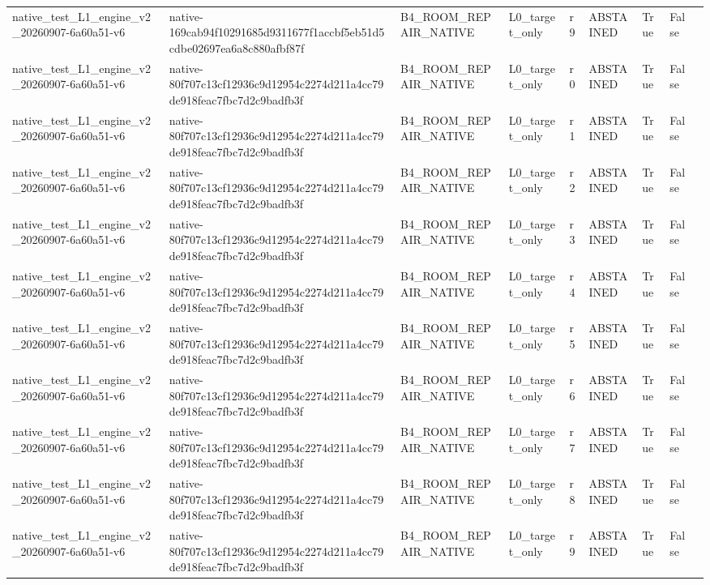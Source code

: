 \begin{tabular}{lllllllll}
native\_test\_L1\_engine\_v2\_20260907-6a60a51-v6 & native-169cab94f10291685d9311677f1accbf5eb51d5cdbe02697ea6a8c880afbf87f & B4\_ROOM\_REPAIR\_NATIVE & L0\_target\_only & r9 & ABSTAINED & True & False &  \\
native\_test\_L1\_engine\_v2\_20260907-6a60a51-v6 & native-80f707c13cf12936c9d12954c2274d211a4cc79de918feac7fbc7d2c9badfb3f & B4\_ROOM\_REPAIR\_NATIVE & L0\_target\_only & r0 & ABSTAINED & True & False &  \\
native\_test\_L1\_engine\_v2\_20260907-6a60a51-v6 & native-80f707c13cf12936c9d12954c2274d211a4cc79de918feac7fbc7d2c9badfb3f & B4\_ROOM\_REPAIR\_NATIVE & L0\_target\_only & r1 & ABSTAINED & True & False &  \\
native\_test\_L1\_engine\_v2\_20260907-6a60a51-v6 & native-80f707c13cf12936c9d12954c2274d211a4cc79de918feac7fbc7d2c9badfb3f & B4\_ROOM\_REPAIR\_NATIVE & L0\_target\_only & r2 & ABSTAINED & True & False &  \\
native\_test\_L1\_engine\_v2\_20260907-6a60a51-v6 & native-80f707c13cf12936c9d12954c2274d211a4cc79de918feac7fbc7d2c9badfb3f & B4\_ROOM\_REPAIR\_NATIVE & L0\_target\_only & r3 & ABSTAINED & True & False &  \\
native\_test\_L1\_engine\_v2\_20260907-6a60a51-v6 & native-80f707c13cf12936c9d12954c2274d211a4cc79de918feac7fbc7d2c9badfb3f & B4\_ROOM\_REPAIR\_NATIVE & L0\_target\_only & r4 & ABSTAINED & True & False &  \\
native\_test\_L1\_engine\_v2\_20260907-6a60a51-v6 & native-80f707c13cf12936c9d12954c2274d211a4cc79de918feac7fbc7d2c9badfb3f & B4\_ROOM\_REPAIR\_NATIVE & L0\_target\_only & r5 & ABSTAINED & True & False &  \\
native\_test\_L1\_engine\_v2\_20260907-6a60a51-v6 & native-80f707c13cf12936c9d12954c2274d211a4cc79de918feac7fbc7d2c9badfb3f & B4\_ROOM\_REPAIR\_NATIVE & L0\_target\_only & r6 & ABSTAINED & True & False &  \\
native\_test\_L1\_engine\_v2\_20260907-6a60a51-v6 & native-80f707c13cf12936c9d12954c2274d211a4cc79de918feac7fbc7d2c9badfb3f & B4\_ROOM\_REPAIR\_NATIVE & L0\_target\_only & r7 & ABSTAINED & True & False &  \\
native\_test\_L1\_engine\_v2\_20260907-6a60a51-v6 & native-80f707c13cf12936c9d12954c2274d211a4cc79de918feac7fbc7d2c9badfb3f & B4\_ROOM\_REPAIR\_NATIVE & L0\_target\_only & r8 & ABSTAINED & True & False &  \\
native\_test\_L1\_engine\_v2\_20260907-6a60a51-v6 & native-80f707c13cf12936c9d12954c2274d211a4cc79de918feac7fbc7d2c9badfb3f & B4\_ROOM\_REPAIR\_NATIVE & L0\_target\_only & r9 & ABSTAINED & True & False &  \\

\end{tabular}
